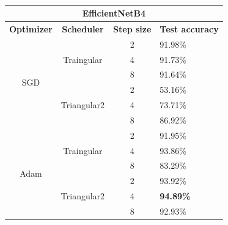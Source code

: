 \begin{table}[ht!]
\centering
\caption{}
\label{tab:efficient}
\begin{tabular}{|ccll|}
\hline
\multicolumn{4}{|c|}{\textbf{EfficientNetB4}}                                          \\ \hline
\multicolumn{1}{|c|}{\textbf{Optimizer}}    & \multicolumn{1}{c|}{\textbf{Scheduler}}           & \multicolumn{1}{c|}{\textbf{Step size}} & \textbf{Test accuracy} \\ \hline
\multicolumn{1}{|c|}{\multirow{6}{*}{SGD}}  & \multicolumn{1}{c|}{\multirow{3}{*}{Traingular}}  & \multicolumn{1}{c|}{2}                  &  91.98\%                \\ \cline{3-4} 
\multicolumn{1}{|c|}{} & \multicolumn{1}{c|}{} & \multicolumn{1}{c|}{4} & 91.73\% \\ \cline{3-4} 
\multicolumn{1}{|c|}{} & \multicolumn{1}{c|}{} & \multicolumn{1}{c|}{8} & 91.64\% \\ \cline{2-4} 
\multicolumn{1}{|c|}{}                      & \multicolumn{1}{c|}{\multirow{3}{*}{Triangular2}} & \multicolumn{1}{c|}{2}                  &  53.16\%               \\ \cline{3-4} 
\multicolumn{1}{|c|}{} & \multicolumn{1}{c|}{} & \multicolumn{1}{c|}{4} & 73.71\% \\ \cline{3-4} 
\multicolumn{1}{|c|}{} & \multicolumn{1}{c|}{} & \multicolumn{1}{c|}{8} & 86.92\% \\ \hline
\multicolumn{1}{|c|}{\multirow{6}{*}{Adam}} & \multicolumn{1}{c|}{\multirow{3}{*}{Traingular}}  & \multicolumn{1}{c|}{2}                  & 91.95\%       \\ \cline{3-4} 
\multicolumn{1}{|c|}{} & \multicolumn{1}{c|}{} & \multicolumn{1}{c|}{4} & 93.86\% \\ \cline{3-4} 
\multicolumn{1}{|c|}{} & \multicolumn{1}{c|}{} & \multicolumn{1}{c|}{8} & 83.29\% \\ \cline{2-4} 
\multicolumn{1}{|c|}{}                      & \multicolumn{1}{c|}{\multirow{3}{*}{Triangular2}} & \multicolumn{1}{c|}{2}                  & 93.92\%                \\ \cline{3-4} 
\multicolumn{1}{|c|}{} & \multicolumn{1}{c|}{} & \multicolumn{1}{c|}{4} & \textbf{94.89\%} \\ \cline{3-4} 
\multicolumn{1}{|c|}{} & \multicolumn{1}{c|}{} & \multicolumn{1}{c|}{8} & 92.93\% \\ \hline
\end{tabular}
\end{table}


